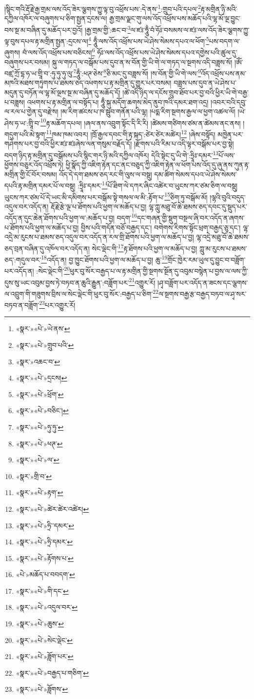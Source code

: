 །སྙིང་གའི་རྡོ་རྗེ་རྒྱ་གྲམ་ལས་འོད་ཟེར་ལྕགས་ཀྱུ་ལྟ་བུ་འཕྲོས་པས་:དེ་ནས་\footnote{«སྣར་»«པེ་»ཡེ་ནས་}:གྲུབ་པའི་དཔལ་\footnote{«སྣར་»«པེ་»གྲུབ་པའི་}རྟ་མགྲིན་ཉི་མའི་དཀྱིལ་འཁོར་ལ་བཞུགས་པ་ཅིག་སྤྱན་དྲངས་ལ། རྒྱ་གྲམ་ལྗང་གུ་ལས་འོད་འཕྲོས་པས་མཆོད་པའི་ལྷ་མོ་ལྔ་བྱུང་བས་སྔ་མ་བཞིན་དུ་མཆོད་པར་བྱའོ། །རྒྱ་གྲམ་གྱི་:ཆང་བ་\footnote{«སྣར་»འཆང་བ་}ལ་ཛཿ་ཧཱུྃ་བཾ་ཧོཿ་བསམས་ལ་ཛཿ་ལས་འོད་ཟེར་ལྕགས་ཀྱུ་ལྟ་བུས་དཔལ་རྟ་མགྲིན་སྤྱན་:དྲངས་ལ།\footnote{«སྣར་»«པེ་»དྲངས།} ཧཱུྃ་ལས་འོད་འཕྲོས་པས་ཡེ་ཤེས་སེམས་དཔའ་ལ་ཕོག་\footnote{«སྣར་»«པེ་»ཕྲོག་}པས་བདག་ལ་ཞུགས། བཾ་ལས་འོད་འཕྲོས་པས་བཅིངས།\footnote{«སྣར་»«པེ་»བཅིང་།} ཧོཿ་ལས་འོད་འཕྲོས་པས་ཡེ་ཤེས་སེམས་དཔའ་དགྱེས་པའི་ཚུལ་དུ་བཞུགས་པར་བསམ། སྐུ་ལ་གཏད་ལ་བསྒོམ་པས་དུབ་ན་ས་བོན་གྱི་ཡི་གེ་ལ་གཏད་ལ་སྔགས་འདི་བཟླས་སོ། །ཨོཾ་བཛྲ་ཀྲོ་དྷ་ཧ་ཡ་གྲཱི་བ་:ཧུ་ཧུ་ཧུ་ལུ་\footnote{«སྣར་»«པེ་»ཧུ་ཧུ་}ཧཱུྃ་:ཕཊ་ཅེས་\footnote{«སྣར་»«པེ་»ཕཊ་}ཅི་མང་དུ་བཟླས་སོ། །ས་བོན་གྱི་ཡི་གེ་ལས་\footnote{«སྣར་»«པེ་»ལ་}འོད་འཕྲོས་པས་ནམ་མཁའི་མཐས་གཏུགས་པ་ཐམས་ཅད་འཕགས་པ་རྟ་མགྲིན་དུ་གྱུར་པར་བསམ། བཟླས་པས་དུབ་ན་ཡེ་ཤེས་པ་མདུན་དུ་བཏོན་ལ་ལྷ་མོ་ལྔས་སྔ་མ་བཞིན་དུ་མཆོད་དོ། །ཚེ་འདི་ཉིད་ལ་དངོས་གྲུབ་ཐོབ་པར་བྱ་བའི་ཕྱིར་ཡི་གེ་བརྒྱ་པ་བཟླས། འཕགས་པ་རྟ་མགྲིན་ལ་བསྟོད་པ། ཧཱུྃ་སྐུ་མདོག་ཆགས་མེད་ནུབ་ཁའི་དམར་ཐག་འདྲ། །འབར་བའི་དབུ་ལ་རལ་པ་གྱེན་དུ་བརྫེས། །མ་རིག་ཚངས་པ་ཁ་སྦུབ་གནོན་པའི་ལྷ། །པདྨ་རིག་སྔགས་རྒྱལ་ལ་ཕྱག་འཚལ་ལོ། །ཡེ་ཤེས་ཧ་ཡ་:གྲཱི་བ་\footnote{«སྣར་»གྲི་བ་}རྟ་མཆོག་དཔལ། །ཞལ་ནས་འབྲུག་སྟོང་དི་རི་རི། །ཚེམས་གཙིགས་ཙམ་ན་ཚེམས་ནང་ནས། །གདུག་པའི་མེ་སྟག་\footnote{«སྣར་»«པེ་»རྟག་}ཁམ་ཁམ་འབར། །ཁྲོ་རྒྱལ་དབང་གི་རྟ་སྐད་:ཙེར་ཙེར་མཚེར།\footnote{«སྣར་»«པེ་»ཚེར་ཚེར་འཚེར།} །ཞེས་བསྟོད། མཁྱེན་པར་གཤེགས་པར་བྱ་བའི་ཕྱིར་ཛཿ་ཛཿཞེས་ལན་གསུམ་བརྗོད་དོ། །རྫོགས་པའི་རིམ་པ་འདི་ལྟར་བསྒོམ་པར་བྱ་སྟེ། བདག་ཉིད་རྟ་མགྲིན་དུ་བསྒོམས་པའི་སྙིང་གར་ཉི་མའི་དཀྱིལ་འཁོར། དེའི་སྟེང་དུ་ཡི་གེ་:ཧྲཱིཿ་དམར་\footnote{«སྣར་»«པེ་»ཧྲི་་དམར་}པོ་ལས་ཕྱོགས་བཅུར་འོད་འཕྲོས་ཏེ། ཕྱི་སྣོད་ཀྱི་འཇིག་རྟེན་དང་ནང་བཅུད་ཀྱི་འཇིག་རྟེན་ལ་ཕོག་པས་འོད་དུ་ཞུ་ནས་ཀུན་རྟ་མགྲིན་གྱི་ངོ་བོར་བསམ། འོད་དེ་དག་ཐམས་ཅད་རང་གི་ལུས་ལ་བསྡུ། དམ་ཚིག་སེམས་དཔའ་ཡེ་ཤེས་སེམས་དཔའི་རྟ་མགྲིན་དམར་པོ་ལ་བསྡུ། :ཧྲཱིཿ་དམར་\footnote{«སྣར་»«པེ་»ཧྲི་དམར་}པོ་ཐིག་ལེ་དཀར་ཞིང་འཚེར་བ་ཡུངས་ཀར་ཙམ་ཅིག་ལ་བསྡུ། ཡུངས་ཀར་ཙམ་པོ་དེ་ཡང་མི་དམིགས་པར་བསྒོམ་སྟེ་གསལ་ལ་མི་:རྟོག་པ་\footnote{«སྣར་»«པེ་»རྟོགས་པ་}ཅིག་ཏུ་བསྒོམ་མོ། །ལྷའི་བུའི་བདུད་འདུལ་བར་འདོད་ན། རྡོ་རྗེ་རྩེ་ལྔ་པ་ཐོགས་པའི་ཕྱག་ལ་མཆོད་པ་བྱ། ལྷ་ཀླུ་མཐུ་བོ་ཆེ་ཐམས་ཅད་དབང་དུ་སྡུད་པར་འདོད་ན་དུང་ཆེན་ཐོགས་པའི་ཕྱག་ལ་:མཆོད་པ་བྱ། བདག་\footnote{«པེ་»མཆོད་པ་བབདག་}དང་གཞན་གྱི་སྡུག་བསྔལ་ཞི་བར་འདོད་ན་ཞགས་པ་ཐོགས་པའི་ཕྱག་ལ་མཆོད་པ་བྱ། བྱིས་པའི་གདོན་བཅོ་བརྒྱད་དང་། བགེགས་རིགས་སྟོང་ཕྲག་བརྒྱད་ཅུ་དང་། ལྷ་འདྲེ་མ་རུངས་པ་ཐམས་ཅད་འདུལ་བར་འདོད་ན་རལ་གྲི་ཐོགས་པའི་ཕྱག་ལ་མཆོད་པ་བྱ། ལྷ་འདྲེ་མཐུ་བོ་ཆེ་ཐམས་ཅད་བྲན་བཞིན་དུ་འཁོལ་བར་འདོད་ན། སེང་ལྡེང་གི་\footnote{«སྣར་»«པེ་»གི་དང་}རྟ་ཐོགས་པའི་ཕྱག་ལ་མཆོད་པ་བྱ། ཀླུ་མ་རུངས་པ་ཐམས་ཅད་:གདུལ་བར་\footnote{«སྣར་»«པེ་»འདུལ་བར་}འདོད་ན། བྱ་ཁྱུང་ཐོགས་པའི་ཕྱག་ལ་མཆོད་པ་བྱ། ཆུ་\footnote{«སྣར་»«པེ་»ཆུས་}གྲོང་ཁྱེར་རམ་ཡུལ་དུ་བྱུང་བ་བཟློག་པར་འདོད་ན། :སེང་ལྡེང་གི་\footnote{«སྣར་»«པེ་»སེང་ལྡེང་}ཕུར་བུ་སོར་བརྒྱད་པ་ལ་རྟ་མགྲིན་གྱི་སྔགས་སྔོན་དུ་འབུམ་བསྙེན་པ་བྱས་ལ་ལས་ཀྱི་དུས་སུ་ཡང་འབུམ་བྱས་ཏེ་བཏབ་ན་ཆུའི་རྒྱུན་:བཟློག་པར་\footnote{«སྣར་»«པེ་»ཟློག་པར་}འགྱུར་རོ། །ཤྭ་བཟློག་པར་འདོད་ན་ཟངས་དང་ལྕགས་ལ་འབྲུག་གི་གཟུགས་བྲིས་ལ་སེང་ལྡེང་གི་ཕུར་བུ་སོར་:བརྒྱད་པ་ཅིག་\footnote{«སྣར་»«པེ་»བརྒྱད་པ་གཅིག་}ལ་སྔགས་བརྒྱ་རྩ་བརྒྱད་བཏབ་ལ་ཤྭ་སར་བཏབ་ན་བཟློག་\footnote{«སྣར་»«པེ་»ཟློགས་}པར་འགྱུར་རོ། 
